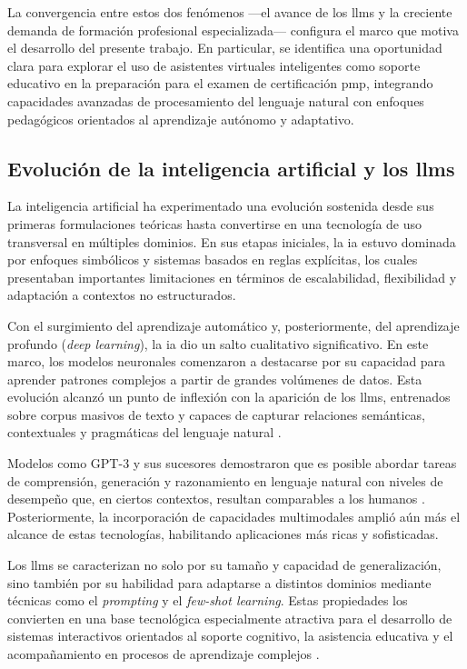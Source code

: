 La convergencia entre estos dos fenómenos —el avance de los \glspl{llm} y la creciente demanda de formación profesional especializada— configura el marco que motiva el desarrollo del presente trabajo. En particular, se identifica una oportunidad clara para explorar el uso de asistentes virtuales inteligentes como soporte educativo en la preparación para el examen de certificación \gls{pmp}, integrando capacidades avanzadas de procesamiento del lenguaje natural con enfoques pedagógicos orientados al aprendizaje autónomo y adaptativo.

\subsection{Evolución de la inteligencia artificial y los \glspl{llm}}

La inteligencia artificial ha experimentado una evolución sostenida desde sus primeras formulaciones teóricas hasta convertirse en una tecnología de uso transversal en múltiples dominios. En sus etapas iniciales, la \gls{ia} estuvo dominada por enfoques simbólicos y sistemas basados en reglas explícitas, los cuales presentaban importantes limitaciones en términos de escalabilidad, flexibilidad y adaptación a contextos no estructurados.

Con el surgimiento del aprendizaje automático y, posteriormente, del aprendizaje profundo (\textit{deep learning}), la \gls{ia} dio un salto cualitativo significativo. En este marco, los modelos neuronales comenzaron a destacarse por su capacidad para aprender patrones complejos a partir de grandes volúmenes de datos. Esta evolución alcanzó un punto de inflexión con la aparición de los \glspl{llm}, entrenados sobre corpus masivos de texto y capaces de capturar relaciones semánticas, contextuales y pragmáticas del lenguaje natural \parencite{zhao2023survey}.

Modelos como GPT-3 y sus sucesores demostraron que es posible abordar tareas de comprensión, generación y razonamiento en lenguaje natural con niveles de desempeño que, en ciertos contextos, resultan comparables a los humanos \parencite{zhao2023survey}. Posteriormente, la incorporación de capacidades multimodales amplió aún más el alcance de estas tecnologías, habilitando aplicaciones más ricas y sofisticadas.

Los \glspl{llm} se caracterizan no solo por su tamaño y capacidad de generalización, sino también por su habilidad para adaptarse a distintos dominios mediante técnicas como el \textit{prompting} y el \textit{few-shot learning}. Estas propiedades los convierten en una base tecnológica especialmente atractiva para el desarrollo de sistemas interactivos orientados al soporte cognitivo, la asistencia educativa y el acompañamiento en procesos de aprendizaje complejos \parencite{zhao2023survey}.

